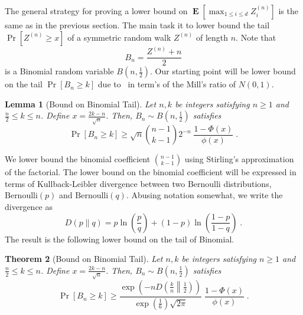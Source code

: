 \documentclass{article}
\DeclareMathOperator*{\Exp}{\mathbf{E}}
\newtheorem{theorem}{Theorem}
\newtheorem{lemma}[theorem]{Lemma}
\begin{document}
The general strategy for proving a lower bound on $\Exp\left[\max_{1 \le i \le d} Z^{(n)}_i \right]$
 is the same as in the previous section. The main task it to lower bound the
tail $\Pr[Z^{(n)} \ge x]$ of a symmetric random walk $Z^{(n)}$ of length
$n$.  Note that
$$
B_n = \frac{Z^{(n)} + n}{2}
$$
is a Binomial random variable $B(n,\frac{1}{2})$. Our starting point will be
lower bound on the tail $\Pr[B_n \ge k]$ due to~\citet[Theorem 2]{McKay1989} in
term's of the Mill's ratio of $N(0,1)$.

\begin{lemma}[Bound on Binomial Tail]
\label{lemma:mckay}
Let $n,k$ be integers satisfying $n \ge 1$ and $\frac{n}{2} \le k \le n$. Define $x = \frac{2k - n}{\sqrt{n}}$. Then, $B_n \sim B(n,\frac{1}{2})$ satisfies
$$
\Pr \left[ B_n \ge  k \right] \ge \sqrt{n} \binom{n-1}{k-1} 2^{-n}
 \; \frac{1 - \Phi(x)}{\phi(x)} \; .
$$
\end{lemma}

We lower bound the binomial coefficient
$\binom{n-1}{k-1}$ using Stirling's approximation of the factorial. The lower
bound on the binomial coefficient will be expressed in terms of
Kullback-Leibler divergence between two Bernoulli distributions,
$\text{Bernoulli}(p)$ and $\text{Bernoulli}(q)$. Abusing notation somewhat,
we write the divergence as
$$
D(p\|q) = p \ln \left( \frac{p}{q} \right) + (1-p) \ln \left( \frac{1-p}{1-q} \right) \; .
$$
The result is the following lower bound on the tail of Binomial.

\begin{theorem}[Bound on Binomial Tail]
\label{theorem:binomial}
Let $n,k$ be integers satisfying $n \ge 1$ and $\frac{n}{2} \le k \le n$. Define $x = \frac{2k - n}{\sqrt{n}}$. Then, $B_n \sim B(n,\frac{1}{2})$ satisfies
$$
\Pr \left[ B_n \ge  k \right] \ge \frac{\exp\left(-n D \left(\frac{k}{n} \middle\| \frac{1}{2} \right)\right)}{\exp\left(\frac{1}{6}\right) \sqrt{2 \pi}} \; \frac{1 - \Phi(x)}{\phi(x)} \; .
$$
\end{theorem}
\end{document}
